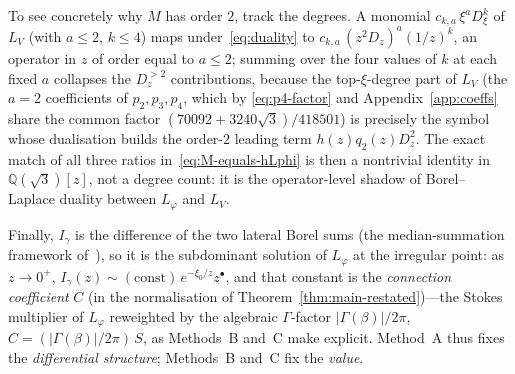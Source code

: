 \documentclass[11pt,reqno]{amsart}
\renewcommand{\_}{\vquadorigunderscore\allowbreak}
\theoremstyle{plain}
\theoremstyle{definition}
\newcommand{\Lphi}{L_{\varphi}}
\newcommand{\LV}{L_{V}}
\newcommand{\Qsqrt}{\mathbb{Q}(\sqrt3)}
\newcommand{\xizero}{\xi_0}
\providecommand{\C}{}\renewcommand{\C}{C}
\begin{document}
To see concretely why $M$ has order $2$, track the degrees. A monomial $c_{k,a}\,\xi^a D_\xi^k$ of
$\LV$ (with $a\le2$, $k\le4$) maps under~\eqref{eq:duality} to
$c_{k,a}\,(z^2D_z)^a(1/z)^k$, an operator in $z$ of order equal to $a\le2$; summing over the four
values of $k$ at each fixed $a$ collapses the $D_z^{>2}$ contributions, because the
top-$\xi$-degree part of $\LV$ (the $a=2$ coefficients of $p_2,p_3,p_4$, which by
\eqref{eq:p4-factor} and Appendix~\ref{app:coeffs} share the common factor
$(70092+3240\sqrt3)/418501$) is precisely the symbol whose dualisation builds the order-$2$ leading
term $h(z)q_2(z)D_z^2$. The exact match of all three ratios in~\eqref{eq:M-equals-hLphi} is then a
nontrivial identity in $\Qsqrt[z]$, not a degree count: it is the operator-level shadow of
Borel--Laplace duality between $\Lphi$ and $\LV$.

Finally, $I_\gamma$ is the difference of the two lateral Borel sums (the median-summation
framework of~\cite{LodayRichaud}), so it is the subdominant
solution of $\Lphi$ at the irregular point: as $z\to0^+$, $I_\gamma(z)\sim(\text{const})\,
e^{-\xizero/z}z^{\bullet}$, and that constant is the \emph{connection coefficient} $\C$
(in the normalisation of Theorem~\ref{thm:main-restated})---the Stokes multiplier of $\Lphi$
reweighted by the algebraic $\Gamma$-factor $\lvert\Gamma(\beta)\rvert/2\pi$,
$\C=(\lvert\Gamma(\beta)\rvert/2\pi)\,S$, as Methods~B and~C make explicit. Method~A thus fixes the
\emph{differential structure}; Methods~B and~C fix the \emph{value}.
\end{document}
